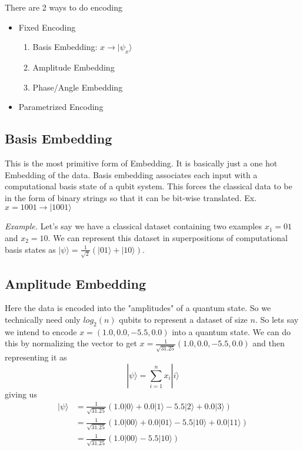 \documentclass[hidelinks]{book}
\numberwithin{equation}{section}
\begin{document}
There are 2 ways to do encoding
\begin{itemize}
  \item Fixed Encoding
    \begin{enumerate}
    \item Basis Embedding: $x \rightarrow |\psi_x\rangle$
    \item Amplitude Embedding
    \item Phase/Angle Embedding
    \end{enumerate}
  \item Parametrized Encoding
\end{itemize}

\subsection{Basis Embedding}
This is the most primitive form of Embedding. It is basically just a one hot
Embedding of the data. Basis embedding associates each input with a computational basis state of a qubit system.
This forces the classical data to be in the form of binary strings so that it can be
bit-wise translated. Ex. $x = 1001 \rightarrow |1001\rangle$

\textit{Example.} Let's say we have a classical dataset containing two examples $x_1 = 01 $ and $x_2 = 10$. We can represent this dataset in superpositions of computational basis states as $|\psi\rangle = \frac{1}{\sqrt{2}}(|01\rangle + |10\rangle)$.

\subsection{Amplitude Embedding}
Here the data is encoded into the "amplitudes" of a quantum state. So we technically need only $log_2(n)$ qubits to represent a dataset of size $n$. So lets say we intend to encode $x = (1.0, 0.0, -5.5, 0.0)$ into a quantum state. We can do this by normalizing the vector to get $x = \frac{1}{\sqrt{31.25}}(1.0, 0.0, -5.5, 0.0)$ and then representing it as
\begin{equation}
  |\psi\rangle = \sum_{i=1}^n x_i |i\rangle
\end{equation}
giving us
\begin{equation}
\begin{split}
  |\psi\rangle & = \frac{1}{\sqrt{31.25}}(1.0|0\rangle + 0.0|1\rangle - 5.5|2\rangle + 0.0|3\rangle) \\
  & = \frac{1}{\sqrt{31.25}}(1.0|00\rangle + 0.0|01\rangle - 5.5|10\rangle + 0.0|11\rangle) \\
  & = \frac{1}{\sqrt{31.25}}(1.0|00\rangle - 5.5|10\rangle)
\end{split}
\end{equation}
\end{document}
